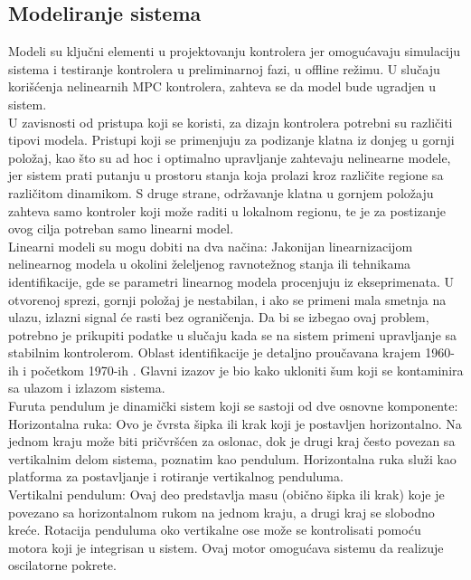 \documentclass[a4paper,11pt]{article}
\theoremstyle{definition} \newtheorem{deff}{Definicija}[section]
\theoremstyle{definition} \newtheorem{prim}[deff]{Primer}
\theoremstyle{plain} \newtheorem{teor}[deff]{Teorema}
\begin{document}
	\subsection{Modeliranje sistema} 
	
	Modeli su ključni elementi u projektovanju kontrolera jer omogućavaju simulaciju sistema i testiranje kontrolera u preliminarnoj fazi, u offline režimu. U slučaju korišćenja nelinearnih MPC kontrolera, zahteva se da model bude ugradjen u sistem.  \\
	
	U zavisnosti od pristupa koji se koristi, za dizajn kontrolera potrebni su različiti tipovi modela. Pristupi koji se primenjuju za podizanje klatna iz donjeg u gornji položaj, kao što su ad hoc i optimalno upravljanje zahtevaju nelinearne modele, jer sistem prati putanju u prostoru stanja koja prolazi kroz različite regione sa različitom dinamikom. S druge strane, održavanje klatna u gornjem položaju zahteva samo kontroler koji može raditi u lokalnom regionu, te je za postizanje ovog cilja potreban samo linearni model.  \\
	
	Linearni modeli su mogu dobiti na dva načina: Jakonijan linearnizacijom nelinearnog modela u okolini želeljenog ravnotežnog stanja ili tehnikama identifikacije, gde se parametri linearnog modela procenjuju iz ekseprimenata. U otvorenoj sprezi, gornji položaj je nestabilan, i ako se primeni mala smetnja na ulazu, izlazni signal će rasti bez ograničenja. Da bi se izbegao ovaj problem, potrebno je prikupiti podatke u slučaju kada se na sistem primeni upravljanje sa stabilnim kontrolerom.  Oblast identifikacije je detaljno proučavana krajem 1960-ih i početkom 1970-ih  \cite{identifikacija}. Glavni izazov je bio kako ukloniti šum koji se kontaminira sa ulazom i izlazom sistema.  \\
	
	
	Furuta pendulum je dinamički sistem koji se sastoji od dve osnovne komponente: \\
	
	Horizontalna ruka: Ovo je čvrsta šipka ili krak koji je postavljen horizontalno. Na jednom kraju može biti pričvršćen za oslonac, dok je drugi kraj često povezan sa vertikalnim delom sistema, poznatim kao pendulum. Horizontalna ruka služi kao platforma za postavljanje i rotiranje vertikalnog penduluma. \\
	
	Vertikalni pendulum: Ovaj deo predstavlja masu (obično šipka ili krak) koje je povezano sa horizontalnom rukom na jednom kraju, a drugi kraj se slobodno kreće. Rotacija penduluma oko vertikalne ose može se kontrolisati pomoću motora koji je integrisan u sistem. Ovaj motor omogućava sistemu da realizuje oscilatorne pokrete.\\
	
\end{document}
